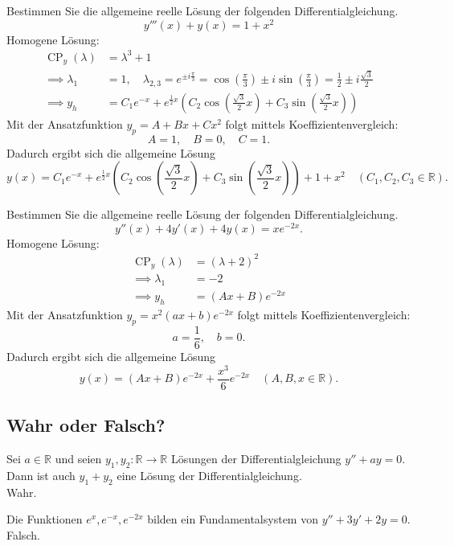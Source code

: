 \documentclass[parskip=full]{scrartcl}
\DeclareMathOperator{\cp}{CP}
\begin{document}
Bestimmen Sie die allgemeine reelle Lösung der folgenden Differentialgleichung.
\begin{displaymath}
  y'''(x) + y(x) = 1 + x^2
\end{displaymath}
Homogene Lösung:
\begin{align*}
  \cp_y(\lambda) &= \lambda^3 + 1\\
  \implies \lambda_1 &= 1, \quad \lambda_{2,3} = e^{\pm i \frac{\pi}{3}} = \cos\left(\frac{\pi}{3}\right) \pm i \sin\left(\frac{\pi}{3}\right) = \frac{1}{2} \pm i \frac{\sqrt{3}}{2}\\
  \implies y_h &= C_1 e^{-x} + e^{\frac{1}{2} x} (C_2 \cos\left(\frac{\sqrt{3}}{2}x\right) + C_3 \sin\left(\frac{\sqrt{3}}{2}x\right))
\end{align*}
Mit der Ansatzfunktion $y_p = A + Bx + Cx^2$ folgt mittels Koeffizientenvergleich:
\begin{displaymath}
  A = 1, \quad B = 0, \quad C = 1.
\end{displaymath}
Dadurch ergibt sich die allgemeine Lösung
\begin{displaymath}
  y(x) = C_1 e^{-x} + e^{\frac{1}{2} x} (C_2 \cos\left(\frac{\sqrt{3}}{2}x\right) + C_3 \sin\left(\frac{\sqrt{3}}{2}x\right)) + 1 + x^2 \quad (C_1, C_2, C_3 \in \mathbb{R}).
\end{displaymath}

Bestimmen Sie die allgemeine reelle Lösung der folgenden Differentialgleichung.
\begin{displaymath}
  y''(x) + 4y'(x) + 4y(x) = xe^{-2x}.
\end{displaymath}
Homogene Lösung:
\begin{align*}
  \cp_y(\lambda) &= (\lambda + 2)^2\\
  \implies \lambda_1 &= -2\\
  \implies y_h &= (Ax + B)e^{-2x}
\end{align*}
Mit der Ansatzfunktion $y_p = x^2(ax + b)e^{-2x}$ folgt mittels Koeffizientenvergleich:
\begin{displaymath}
  a = \frac{1}{6}, \quad b = 0.
\end{displaymath}
Dadurch ergibt sich die allgemeine Lösung
\begin{displaymath}
  y(x) = (Ax + B) e^{-2x} + \frac{x^3}{6}e^{-2x} \quad (A,B,x \in \mathbb{R}).
\end{displaymath}

\subsection{Wahr oder Falsch?}
Sei $a \in \mathbb{R}$ und seien $y_1, y_2 : \mathbb{R} \to \mathbb{R}$ Lösungen der Differentialgleichung $y'' + ay = 0$.
Dann ist auch $y_1 + y_2$ eine Lösung der Differentialgleichung.\\
Wahr.

Die Funktionen $e^x, e^{-x}, e^{-2x}$ bilden ein Fundamentalsystem von $y'' + 3y' + 2y = 0$.\\
Falsch.

\end{document}
